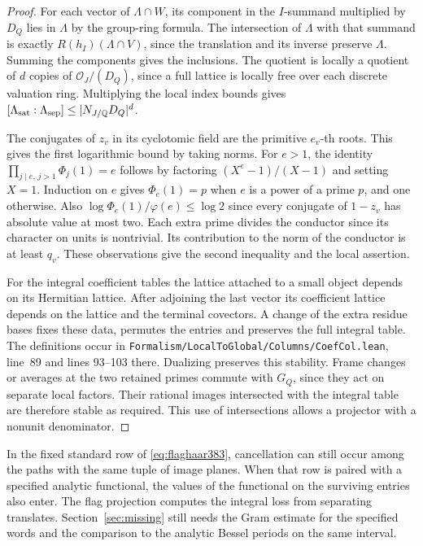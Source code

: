 \documentclass[a4paper,11pt]{article}
\theoremstyle{definition}
\theoremstyle{remark}
\newcommand{\srcloc}[2]{{\small\nolinkurl{#1.lean}}, line~#2}
\numberwithin{equation}{section}
\begin{document}
\begin{proof}
For each vector of \(\Lambda\cap W\), its component in the
\(I\)-summand multiplied by \(D_Q\) lies in \(\Lambda\) by the
group-ring formula. The intersection of \(\Lambda\) with that
summand is exactly \(R(h_I)(\Lambda\cap V)\), since the
translation and its inverse preserve \(\Lambda\). Summing the
components gives the inclusions. The quotient is locally a
quotient of \(d\) copies of \(\mathcal O_J/(D_Q)\), since a
full lattice is locally free over each discrete valuation ring.
Multiplying the local index bounds gives
\([\Lambda_{\rm sat}:\Lambda_{\rm sep}]\le|N_{J/\mathbb Q}D_Q|^d\).

The conjugates of \(z_v\) in its cyclotomic field are the
primitive \(e_v\)-th roots. This gives the first logarithmic
bound by taking norms. For \(e>1\), the identity
\(\prod_{j\mid e,\,j>1}\Phi_j(1)=e\) follows by factoring
\((X^e-1)/(X-1)\) and setting \(X=1\). Induction on \(e\)
gives \(\Phi_e(1)=p\) when \(e\) is a power of a prime \(p\),
and one otherwise. Also
\(\log\Phi_e(1)/\varphi(e)\le\log2\) since every conjugate
of \(1-z_v\) has absolute value at most two. Each extra
prime divides the conductor since its character on units is
nontrivial. Its contribution to the norm of the conductor
is at least \(q_v\). These observations give the second
inequality and the local assertion.

For the integral coefficient tables the lattice attached to a
small object depends on its Hermitian lattice. After adjoining
the last vector its coefficient lattice depends on the lattice
and the terminal covectors. A change of the extra residue bases
fixes these data, permutes the entries and preserves the full
integral table. The definitions occur in
\srcloc{Formalism/LocalToGlobal/Columns/CoefCol}{89}
and lines 93--103 there. Dualizing preserves this stability.
Frame changes or averages at the two retained primes commute
with \(G_Q\), since they act on separate local factors. Their
rational images intersected with the integral table are
therefore stable as required. This use of intersections allows
a projector with a nonunit denominator.
\end{proof}

In the fixed standard row of \eqref{eq:flaghaar383}, cancellation
can still occur among the paths with the same tuple of image
planes. When that row is paired with a specified analytic
functional, the values of the functional on the surviving entries
also enter. The flag projection computes the integral loss from
separating translates. Section~\ref{sec:missing} still needs
the Gram estimate for the specified words and the comparison to
the analytic Bessel periods on the same interval.
\end{document}
